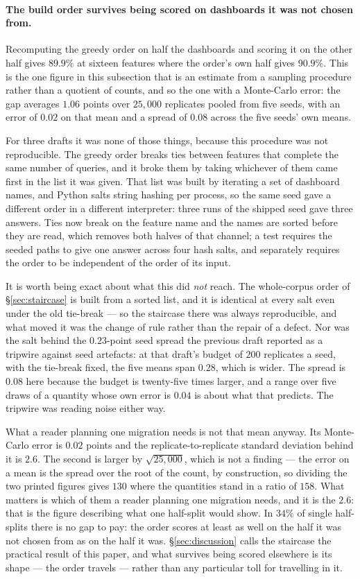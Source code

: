 \paragraph{The build order survives being scored on dashboards it was not chosen from.}
Recomputing the greedy order on half the dashboards and scoring it on the other half
gives $89.9\%$ at sixteen features where the order's own half gives $90.9\%$. This is the
one figure in this subsection that is an estimate from a sampling procedure rather than a
quotient of counts, and so the one with a Monte-Carlo error: the gap averages $1.06$
points over $25{,}000$ replicates pooled from five seeds, with an error of $0.02$ on that
mean and a spread of $0.08$ across the five seeds' own means.

For three drafts it was none of those things, because this procedure was not
reproducible. The greedy order breaks ties between features that complete the same number
of queries, and it broke them by taking whichever of them came first in the list it was
given. That list was built by iterating a set of dashboard names, and Python salts string
hashing per process, so the same seed gave a different order in a different interpreter:
three runs of the shipped seed gave three answers. Ties now break on the feature name and
the names are sorted before they are read, which removes both halves of that channel; a
test requires the seeded paths to give one answer across four hash salts, and separately
requires the order to be independent of the order of its input.

It is worth being exact about what this did \emph{not} reach. The whole-corpus order
of \S\ref{sec:staircase} is built from a sorted list, and it is identical at every salt
even under the old tie-break --- so the staircase there was always reproducible, and what
moved it was the change of rule rather than the repair of a defect. Nor was the salt
behind the $0.23$-point seed spread the previous draft reported as a tripwire against
seed artefacts: at that draft's budget of $200$ replicates a seed, with the tie-break
fixed, the five means span $0.28$, which is wider. The spread is $0.08$ here because the
budget is twenty-five times larger, and a range over five draws of a quantity whose own
error is $0.04$ is about what that predicts. The tripwire was reading noise either way.

What a reader planning one migration needs is not that mean anyway. Its Monte-Carlo error
is $0.02$ points and the replicate-to-replicate standard deviation behind it is $2.6$.
The second is larger by $\sqrt{25{,}000}$, which is not a finding --- the error on a
mean is the spread over the root of the count, by construction, so dividing the two
printed figures gives $130$ where the quantities stand in a ratio of $158$. What
matters is which of them a reader planning one migration needs, and it is the $2.6$:
that is the figure describing what one half-split would show. In $34\%$ of single half-splits there is no gap to pay: the order
scores at least as well on the half it was not chosen from as on the half it was.
\S\ref{sec:discussion} calls the staircase the practical result of this paper, and what
survives being scored elsewhere is its shape --- the order travels --- rather than any
particular toll for travelling in it.

